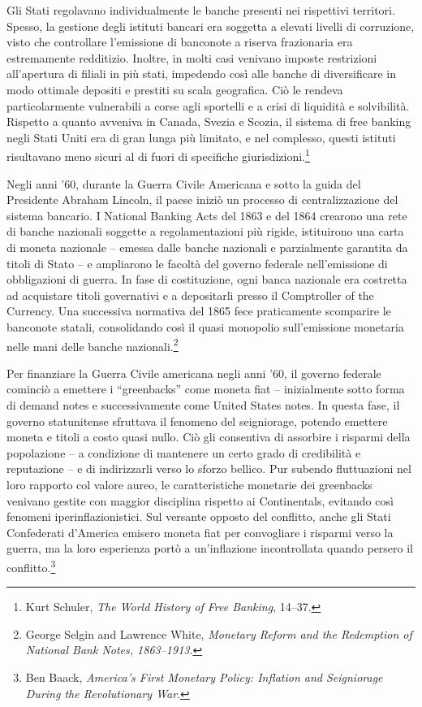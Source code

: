 \documentclass[
  a5paper,
  smalldemyvopaper,10pt,twoside,onecolumn,openright,extrafontsizes,hidelinks]{memoir}
\begin{document}
Gli Stati regolavano individualmente le banche presenti nei rispettivi
territori. Spesso, la gestione degli istituti bancari era soggetta a
elevati livelli di corruzione, visto che controllare l'emissione di
banconote a riserva frazionaria era estremamente redditizio. Inoltre, in
molti casi venivano imposte restrizioni all'apertura di filiali in più
stati, impedendo così alle banche di diversificare in modo ottimale
depositi e prestiti su scala geografica. Ciò le rendeva particolarmente
vulnerabili a corse agli sportelli e a crisi di liquidità e solvibilità.
Rispetto a quanto avveniva in Canada, Svezia e Scozia, il sistema di
free banking negli Stati Uniti era di gran lunga più limitato, e nel
complesso, questi istituti risultavano meno sicuri al di fuori di
specifiche giurisdizioni.\footnote{Kurt Schuler, \emph{The World History
  of Free Banking}, 14--37.}

Negli anni '60, durante la Guerra Civile Americana e sotto la guida del
Presidente Abraham Lincoln, il paese iniziò un processo di
centralizzazione del sistema bancario. I National Banking Acts del 1863
e del 1864 crearono una rete di banche nazionali soggette a
regolamentazioni più rigide, istituirono una carta di moneta nazionale
-- emessa dalle banche nazionali e parzialmente garantita da titoli di
Stato -- e ampliarono le facoltà del governo federale nell'emissione di
obbligazioni di guerra. In fase di costituzione, ogni banca nazionale
era costretta ad acquistare titoli governativi e a depositarli presso il
Comptroller of the Currency. Una successiva normativa del 1865 fece
praticamente scomparire le banconote statali, consolidando così il quasi
monopolio sull'emissione monetaria nelle mani delle banche
nazionali.\footnote{George Selgin and Lawrence White, \emph{Monetary
  Reform and the Redemption of National Bank Notes, 1863--1913}.}

Per finanziare la Guerra Civile americana negli anni '60, il governo
federale cominciò a emettere i ``greenbacks'' come moneta fiat --
inizialmente sotto forma di demand notes e successivamente come United
States notes. In questa fase, il governo statunitense sfruttava il
fenomeno del seigniorage, potendo emettere moneta e titoli a costo quasi
nullo. Ciò gli consentiva di assorbire i risparmi della popolazione -- a
condizione di mantenere un certo grado di credibilità e reputazione -- e
di indirizzarli verso lo sforzo bellico. Pur subendo fluttuazioni nel
loro rapporto col valore aureo, le caratteristiche monetarie dei
greenbacks venivano gestite con maggior disciplina rispetto ai
Continentals, evitando così fenomeni iperinflazionistici. Sul versante
opposto del conflitto, anche gli Stati Confederati d'America emisero
moneta fiat per convogliare i risparmi verso la guerra, ma la loro
esperienza portò a un'inflazione incontrollata quando persero il
conflitto.\footnote{Ben Baack, \emph{America's First Monetary Policy:
  Inflation and Seigniorage During the Revolutionary War}.}
\end{document}
